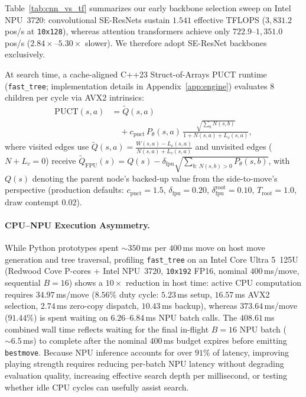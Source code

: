 \documentclass[10pt,twocolumn]{article}
\begin{document}
Table~\ref{tab:cnn_vs_tf} summarizes our early backbone selection sweep on Intel NPU~3720: convolutional SE-ResNets sustain $1.541$ effective TFLOPS ($3{,}831.2$\,pos/s at \texttt{10x128}), whereas attention transformers achieve only $722.9$--$1{,}351.0$\,pos/s ($2.84\times$--$5.30\times$ slower). We therefore adopt SE-ResNet backbones exclusively.

At search time, a cache-aligned C++23 Struct-of-Arrays PUCT runtime (\texttt{fast\_tree}; implementation details in Appendix~\ref{app:engine}) evaluates 8 children per cycle via AVX2 intrinsics:
\begin{equation}
  \begin{aligned}
    \mathrm{PUCT}(s,a) &= \tilde{Q}(s,a) \\
    &\quad + c_{\mathrm{puct}}\,P_\theta(s,a)\,\frac{\sqrt{\sum_b N(s,b)}}{1 + N(s,a) + L_v(s,a)},
  \end{aligned}
  \label{eq:puct}
\end{equation}
where visited edges use $\tilde{Q}(s,a) = \frac{W(s,a) - L_v(s,a)}{N(s,a) + L_v(s,a)}$ and unvisited edges ($N+L_v=0$) receive $\tilde{Q}_{\mathrm{FPU}}(s) = Q(s) - \delta_{\mathrm{fpu}}\sqrt{\sum_{b:\,N(s,b)>0} P_\theta(s,b)}$, with $Q(s)$ denoting the parent node's backed-up value from the side-to-move's perspective (production defaults: $c_{\mathrm{puct}}=1.5$, $\delta_{\mathrm{fpu}}=0.20$, $\delta_{\mathrm{fpu}}^{\mathrm{root}}=0.10$, $T_{\mathrm{root}}=1.0$, draw contempt $0.02$).

\paragraph{CPU--NPU Execution Asymmetry.}
While Python prototypes spent ${\sim}350$\,ms per $400$\,ms move on host move generation and tree traversal, profiling \texttt{fast\_tree} on an Intel Core Ultra 5~125U (Redwood Cove P-cores + Intel NPU~3720, \texttt{10x192} FP16, nominal $400$\,ms/move, sequential $B=16$) shows a $10\times$ reduction in host time: active CPU computation requires $34.97$\,ms/move ($8.56\%$ duty cycle: $5.23$\,ms setup, $16.57$\,ms AVX2 selection, $2.74$\,ms zero-copy dispatch, $10.43$\,ms backup), whereas $373.64$\,ms/move ($91.44\%$) is spent waiting on $6.26$--$6.84$\,ms NPU batch calls. The $408.61$\,ms combined wall time reflects waiting for the final in-flight $B=16$ NPU batch (${\sim}6.5$\,ms) to complete after the nominal $400$\,ms budget expires before emitting \texttt{bestmove}. Because NPU inference accounts for over $91\%$ of latency, improving playing strength requires reducing per-batch NPU latency without degrading evaluation quality, increasing effective search depth per millisecond, or testing whether idle CPU cycles can usefully assist search.
\end{document}
